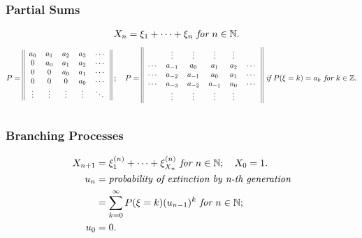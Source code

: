 \documentclass{article}
\begin{document}
\subsubsection{Partial Sums}
\begin{align*}
    X_n & = \xi_1 + \dots + \xi_n \emph{ for } n\in \mathbb{N}.
\end{align*}
\begin{align*}
    P = 
    \begin{blockarray}{ccccc}
        \begin{block}{||ccccc||}
            a_0 & a_1 & a_2 & a_3 & \cdots \\
            0 & a_0 & a_1 & a_2 & \cdots \\
            0 & 0 & a_0 & a_1 & \cdots \\
            0 & 0 & 0 & a_0 & \cdots \\
            \vdots & \vdots & \vdots & \vdots & \ddots \\
        \end{block} 
    \end{blockarray}\; ; \quad 
    P = 
    \begin{blockarray}{cccccc}
        \begin{block}{||cccccc||}
            & \vdots & \vdots & \vdots & \vdots & \\
            \cdots & a_{-1} & a_0 & a_1 & a_2 & \cdots \\
            \cdots & a_{-2} & a_{-1} & a_0 & a_1 & \cdots \\
            \cdots & a_{-3} & a_{-2} & a_{-1} & a_0 & \cdots \\
            & \vdots & \vdots & \vdots & \vdots & \\
        \end{block} 
    \end{blockarray} \emph{ if } P(\xi = k) = a_k \emph{ for }k \in \mathbb{Z}.
\end{align*}

\subsubsection{Branching Processes}
\begin{align*}
    X_{n+1} & = \xi_1^{(n)} + \dots + \xi_{X_n}^{(n)} \emph{ for } n\in \mathbb{N}; \quad X_0 = 1. \\
    u_n & = \emph{probability of extinction by n-th generation} \\
    & = \sum_{k=0}^{\infty}P(\xi = k)(u_{n-1})^k \emph{ for } n\in \mathbb{N}; \\
    u_0 & = 0.
\end{align*}
\end{document}
